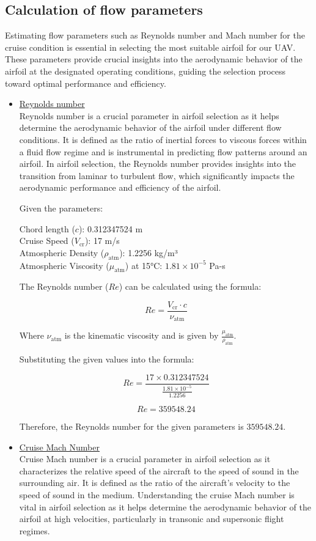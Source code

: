 \documentclass[12 pt]{article}
\begin{document}
\subsection{Calculation of flow parameters}
\color{black}
Estimating flow parameters such as Reynolds number and Mach number for the cruise condition is essential in selecting the most suitable airfoil for our UAV. These parameters provide crucial insights into the aerodynamic behavior of the airfoil at the designated operating conditions, guiding the selection process toward optimal performance and efficiency. 
\color{red}
\begin{itemize}
\item{\underline{Reynolds number}}
\color{black}
\\Reynolds number is a crucial parameter in airfoil selection as it helps determine the aerodynamic behavior of the airfoil under different flow conditions. It is defined as the ratio of inertial forces to viscous forces within a fluid flow regime and is instrumental in predicting flow patterns around an airfoil. In airfoil selection, the Reynolds number provides insights into the transition from laminar to turbulent flow, which significantly impacts the aerodynamic performance and efficiency of the airfoil.

Given the parameters:

 Chord length (\( c \)): 0.312347524 m\\
 Cruise Speed (\( V_{\text{cr}} \)): 17 m/s\\
 Atmospheric Density (\( \rho_{\text{atm}} \)): 1.2256 kg/m³\\
 Atmospheric Viscosity (\( \mu_{\text{atm}} \)) at 15°C: \( 1.81 \times 10^{-5} \) Pa-s

The Reynolds number (\( Re \)) can be calculated using the formula:

\[
Re = \frac{V_{\text{cr}} \cdot c}{\nu_{\text{atm}}} \tag{6.2}
\]

Where \( \nu_{\text{atm}} \) is the kinematic viscosity and is given by \( \frac{\mu_{\text{atm}}}{\rho_{\text{atm}}} \).

Substituting the given values into the formula:

\[
Re = \frac{17 \times 0.312347524}{\frac{1.81 \times 10^{-5}}{1.2256}} \tag{6.3}
\]

\[
Re = 359548.24
\]

Therefore, the Reynolds number for the given parameters is \( 359548.24 \). 
\color{red}
\item{\underline {Cruise Mach Number}}
\color{black}
\\Cruise Mach number is a crucial parameter in airfoil selection as it characterizes the relative speed of the aircraft to the speed of sound in the surrounding air. It is defined as the ratio of the aircraft's velocity to the speed of sound in the medium. Understanding the cruise Mach number is vital in airfoil selection as it helps determine the aerodynamic behavior of the airfoil at high velocities, particularly in transonic and supersonic flight regimes.


\end{itemize}
\end{document}
